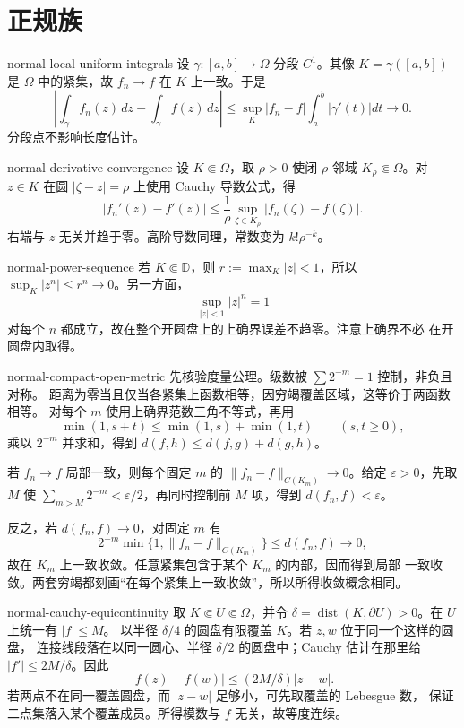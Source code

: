 \chapter{正规族}

\begin{solution}{normal-local-uniform-integrals}
设 $\gamma:[a,b]\to\Omega$ 分段 $C^1$。其像 $K=\gamma([a,b])$ 是
$\Omega$ 中的紧集，故 $f_n\to f$ 在 $K$ 上一致。于是
\[
 \left|\int_\gamma f_n(z)\,dz-\int_\gamma f(z)\,dz\right|
 \le \sup_K|f_n-f|\int_a^b|\gamma'(t)|dt\longrightarrow0.
\]
分段点不影响长度估计。
\end{solution}

\begin{solution}{normal-derivative-convergence}
设 $K\Subset\Omega$，取 $\rho>0$ 使闭 $\rho$ 邻域
$K_\rho\Subset\Omega$。对 $z\in K$ 在圆 $|\zeta-z|=\rho$ 上使用 Cauchy
导数公式，得
\[
 |f_n'(z)-f'(z)|
 \le \frac1\rho\sup_{\zeta\in K_\rho}|f_n(\zeta)-f(\zeta)|.
\]
右端与 $z$ 无关并趋于零。高阶导数同理，常数变为 $k!\rho^{-k}$。
\end{solution}

\begin{solution}{normal-power-sequence}
若 $K\Subset\mathbb D$，则 $r:=\max_K|z|<1$，所以
$\sup_K|z^n|\le r^n\to0$。另一方面，
\[
 \sup_{|z|<1}|z|^n=1
\]
对每个 $n$ 都成立，故在整个开圆盘上的上确界误差不趋零。注意上确界不必
在开圆盘内取得。
\end{solution}

\begin{solution}{normal-compact-open-metric}
先核验度量公理。级数被 $\sum2^{-m}=1$ 控制，非负且对称。
距离为零当且仅当各紧集上函数相等，因穷竭覆盖区域，这等价于两函数相等。
对每个 $m$ 使用上确界范数三角不等式，再用
\[
 \min(1,s+t)\le\min(1,s)+\min(1,t)\qquad(s,t\ge0),
\]
乘以 $2^{-m}$ 并求和，得到 $d(f,h)\le d(f,g)+d(g,h)$。

若 $f_n\to f$ 局部一致，则每个固定 $m$ 的
$\|f_n-f\|_{C(K_m)}\to0$。给定 $\varepsilon>0$，先取 $M$ 使
$\sum_{m>M}2^{-m}<\varepsilon/2$，再同时控制前 $M$ 项，得到
$d(f_n,f)<\varepsilon$。

反之，若 $d(f_n,f)\to0$，对固定 $m$ 有
\[
 2^{-m}\min\{1,\|f_n-f\|_{C(K_m)}\}\le d(f_n,f)\to0,
\]
故在 $K_m$ 上一致收敛。任意紧集包含于某个 $K_m$ 的内部，因而得到局部
一致收敛。两套穷竭都刻画“在每个紧集上一致收敛”，所以所得收敛概念相同。
\end{solution}

\begin{solution}{normal-cauchy-equicontinuity}
取 $K\Subset U\Subset\Omega$，并令
$\delta=\operatorname{dist}(K,\partial U)>0$。在 $U$ 上统一有 $|f|\le M$。
以半径 $\delta/4$ 的圆盘有限覆盖 $K$。若 $z,w$ 位于同一个这样的圆盘，
连接线段落在以同一圆心、半径 $\delta/2$ 的圆盘中；Cauchy 估计在那里给
$|f'|\le 2M/\delta$。因此
\[
 |f(z)-f(w)|\le(2M/\delta)|z-w|.
\]
若两点不在同一覆盖圆盘，而 $|z-w|$ 足够小，可先取覆盖的 Lebesgue 数，
保证二点集落入某个覆盖成员。所得模数与 $f$ 无关，故等度连续。
\end{solution}

